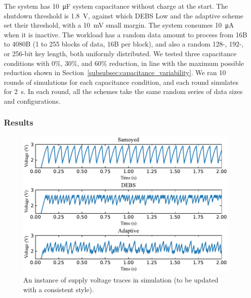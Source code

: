 The system has \SI{10}{\micro\farad} system capacitance without charge at the start. 
The shutdown threshold is \SI{1.8}{\volt}, against which DEBS Low and the adaptive scheme set their threshold, with a \SI{10}{\milli\volt} small margin. 
The system consumes \SI{10}{\micro\ampere} when it is inactive.
The workload has a random data amount to process from 16B to 4080B (1 to 255 blocks of data, 16B per block), and also a random 128-, 192-, or 256-bit key length, both uniformly distributed.
We tested three capacitance conditions with 0\%, 30\%, and 60\% reduction, in line with the maximum possible reduction shown in Section~\ref{subsubsec:capacitance_variability}. 
We ran 10 rounds of simulations for each capacitance condition, and each round simulates for \SI{2}{\second}. 
In each round, all the schemes take the same random series of data sizes and configurations.

\subsubsection{Results}

% 
% 

%




\begin{figure}[!t]
    \centering
    \includegraphics[width=0.9\columnwidth]{ch5_optic/figures/voltage_traces.pdf}
    \caption{An instance of supply voltage traces in simulation (to be updated with a consistent style). }
    \label{fig:simulation_voltage}
\end{figure}

